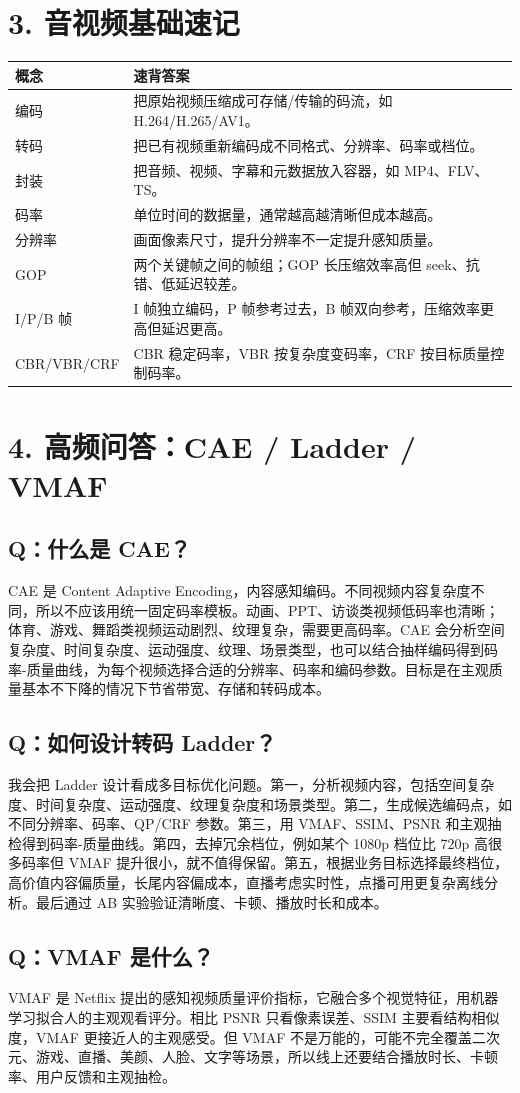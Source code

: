 ﻿\documentclass[11pt,a4paper]{ctexart}
\newcommand{\qa}[2]{\subsection*{Q：#1}\begin{answerbox}#2\end{answerbox}}
\begin{document}
\section{3. 音视频基础速记}
\begin{tabularx}{\textwidth}{p{2.6cm}X}
\toprule
\textbf{概念} & \textbf{速背答案} \\
\midrule
编码 & 把原始视频压缩成可存储/传输的码流，如 H.264/H.265/AV1。 \\
转码 & 把已有视频重新编码成不同格式、分辨率、码率或档位。 \\
封装 & 把音频、视频、字幕和元数据放入容器，如 MP4、FLV、TS。 \\
码率 & 单位时间的数据量，通常越高越清晰但成本越高。 \\
分辨率 & 画面像素尺寸，提升分辨率不一定提升感知质量。 \\
GOP & 两个关键帧之间的帧组；GOP 长压缩效率高但 seek、抗错、低延迟较差。 \\
I/P/B 帧 & I 帧独立编码，P 帧参考过去，B 帧双向参考，压缩效率更高但延迟更高。 \\
CBR/VBR/CRF & CBR 稳定码率，VBR 按复杂度变码率，CRF 按目标质量控制码率。 \\
\bottomrule
\end{tabularx}

\newpage
\section{4. 高频问答：CAE / Ladder / VMAF}

\qa{什么是 CAE？}{CAE 是 Content Adaptive Encoding，内容感知编码。不同视频内容复杂度不同，所以不应该用统一固定码率模板。动画、PPT、访谈类视频低码率也清晰；体育、游戏、舞蹈类视频运动剧烈、纹理复杂，需要更高码率。CAE 会分析空间复杂度、时间复杂度、运动强度、纹理、场景类型，也可以结合抽样编码得到码率-质量曲线，为每个视频选择合适的分辨率、码率和编码参数。目标是在主观质量基本不下降的情况下节省带宽、存储和转码成本。}

\qa{如何设计转码 Ladder？}{我会把 Ladder 设计看成多目标优化问题。第一，分析视频内容，包括空间复杂度、时间复杂度、运动强度、纹理复杂度和场景类型。第二，生成候选编码点，如不同分辨率、码率、QP/CRF 参数。第三，用 VMAF、SSIM、PSNR 和主观抽检得到码率-质量曲线。第四，去掉冗余档位，例如某个 1080p 档位比 720p 高很多码率但 VMAF 提升很小，就不值得保留。第五，根据业务目标选择最终档位，高价值内容偏质量，长尾内容偏成本，直播考虑实时性，点播可用更复杂离线分析。最后通过 AB 实验验证清晰度、卡顿、播放时长和成本。}

\qa{VMAF 是什么？}{VMAF 是 Netflix 提出的感知视频质量评价指标，它融合多个视觉特征，用机器学习拟合人的主观观看评分。相比 PSNR 只看像素误差、SSIM 主要看结构相似度，VMAF 更接近人的主观感受。但 VMAF 不是万能的，可能不完全覆盖二次元、游戏、直播、美颜、人脸、文字等场景，所以线上还要结合播放时长、卡顿率、用户反馈和主观抽检。}
\end{document}
